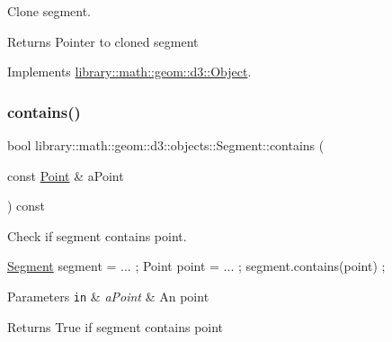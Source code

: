 Clone segment. 

\begin{DoxyReturn}{Returns}
Pointer to cloned segment 
\end{DoxyReturn}


Implements \hyperlink{classlibrary_1_1math_1_1geom_1_1d3_1_1_object_a1a784c6b359e0eb97cd34fabc42f2f3f}{library\+::math\+::geom\+::d3\+::\+Object}.

\mbox{\label{classlibrary_1_1math_1_1geom_1_1d3_1_1objects_1_1_segment_aabdbcd6bbfbe9350fe53f1b3563b5652}} 
\subsubsection{\texorpdfstring{contains()}{contains()}}
{\footnotesize\ttfamily bool library\+::math\+::geom\+::d3\+::objects\+::\+Segment\+::contains (\begin{DoxyParamCaption}\item[{const \hyperlink{classlibrary_1_1math_1_1geom_1_1d3_1_1objects_1_1_point}{Point} \&}]{a\+Point }\end{DoxyParamCaption}) const}



Check if segment contains point. 


\begin{DoxyCode}
\hyperlink{classlibrary_1_1math_1_1geom_1_1d3_1_1objects_1_1_segment_a5562342d1edf2f52e37ce1bc138ee7d7}{Segment} segment = ... ;
Point point = ... ;
segment.contains(point) ;
\end{DoxyCode}



\begin{DoxyParams}[1]{Parameters}
\mbox{\tt in}  & {\em a\+Point} & An point \\
\hline
\end{DoxyParams}
\begin{DoxyReturn}{Returns}
True if segment contains point 
\end{DoxyReturn}
\mbox{\label{classlibrary_1_1math_1_1geom_1_1d3_1_1objects_1_1_segment_a6788da2dd6ee48ded2da197c01ea7f3d}} 
